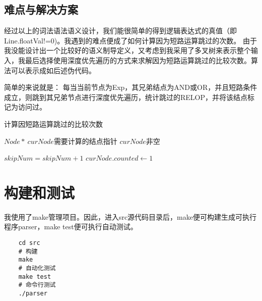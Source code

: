\documentclass[UTF8,11pt,a4paper]{ctexart}%
\begin{document}
\subsection{难点与解决方案}
\hspace{2em}经过以上的词法语法语义设计，我们能很简单的得到逻辑表达式的真值（即Line.floatVal!=0)。我遇到的难点便成了如何计算因为短路运算跳过的次数。
由于我没能设计出一个比较好的语义制导定义，又考虑到我采用了多叉树来表示整个输入，我最后选择使用深度优先遍历的方式来求解因为短路运算跳过的比较次数。算法可以表示成如后述伪代码。
\par{\hspace{2em}简单的来说就是： 每当当前节点为Exp，其兄弟结点为AND或OR，并且短路条件成立，则跳到其兄弟节点进行深度优先遍历，统计跳过的RELOP，并将该结点标记为访问过。}
\begin{algorithm}
    \caption{计算因短路运算跳过的比较次数}
    \begin{algorithmic}[1]
        \Require $Node*\ curNode$需要计算的结点指针
        \Ensure $curNode$非空
                \State \Return{}
            \EndIf

                \State {}
            \EndIf

                \State {}
            \EndIf

            \State {}
            \State {}
        \EndFunction
        \State
                \State \Return{}
            \EndIf

                \State $skipNum=skipNum+1$
                \State $curNode.counted \gets 1$
            \EndIf

            \State {}
            \State {}
        \EndFunction
    \end{algorithmic}
\end{algorithm}

\section{构建和测试}
我使用了make管理项目。因此，进入src源代码目录后，make便可构建生成可执行程序parser，make test便可执行自动测试。
\begin{verbatim}
    cd src
    # 构建
    make
    # 自动化测试
    make test
    # 命令行测试
    ./parser
\end{verbatim}
\end{document}
